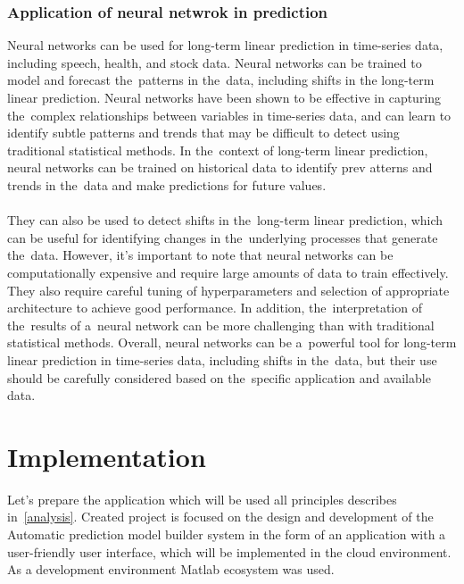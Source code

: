 \documentclass[12pt]{article}
\begin{document}
    \subsection{Application of neural netwrok in prediction} \label{subsec:nnprediction}
    Neural networks can be used for long-term linear prediction in time-series data, including speech, health, and stock data. Neural networks can be trained to model and forecast the~patterns in the~data, including shifts in the long-term linear prediction. Neural networks have been shown to be effective in capturing the~complex relationships between variables in time-series data, and can learn to identify subtle patterns and trends that may be difficult to detect using traditional statistical methods. In the~context of long-term linear prediction, neural networks can be trained on historical data to identify prev    atterns and trends in the~data and make predictions for future values.\\
    \\
    They can also be used to detect shifts in the~long-term linear prediction, which can be useful for identifying changes in the~underlying processes that generate the~data. However, it's important to note that neural networks can be computationally expensive and require large amounts of data to train effectively. They also require careful tuning of hyperparameters and selection of appropriate architecture to achieve good performance. In addition, the~interpretation of the~results of a~neural network can be more challenging than with traditional statistical methods. Overall, neural networks can be a~powerful tool for long-term linear prediction in time-series data, including shifts in the~data, but their use should be carefully considered based on the~specific application and available data.
    \\
    \chapter{Implementation}
      Let's prepare the application which will be used all principles describes in~\ref{analysis}. Created project is focused on the design and development of the Automatic prediction model builder system in the form of an application with a user-friendly user interface, which will be implemented in the cloud environment. As a development environment Matlab ecosystem was used.
\end{document}

